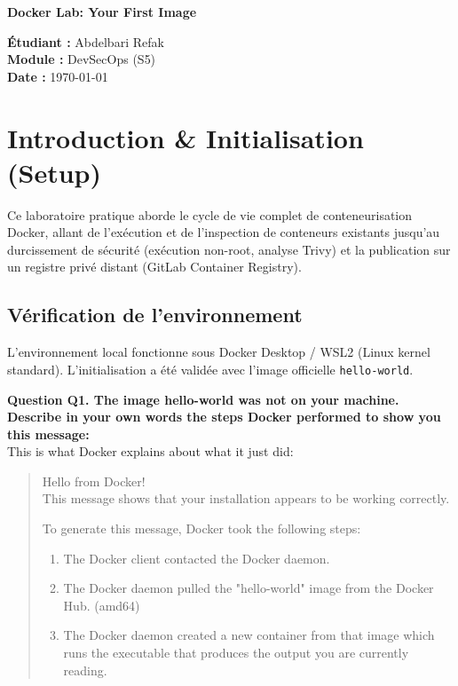 \documentclass[11pt,a4paper]{article}
\begin{document}
\begin{center}
    {\LARGE \textbf{\color{primary} Docker Lab: Your First Image}}\\[0.3cm]
\end{center}

\noindent
\begin{minipage}[t]{0.55\textwidth}
    \textbf{Étudiant :} Abdelbari Refak \\
    \textbf{Module :} DevSecOps (S5) \\
    \textbf{Date :} \today
\end{minipage}
\hfill
\begin{minipage}[t]{0.42\textwidth}
     
\end{minipage}

\vspace{0.5cm}

\section{Introduction \& Initialisation (Setup)}

Ce laboratoire pratique aborde le cycle de vie complet de conteneurisation Docker, allant de l'exécution et de l'inspection de conteneurs existants jusqu'au durcissement de sécurité (exécution non-root, analyse Trivy) et la publication sur un registre privé distant (GitLab Container Registry).

\subsection{Vérification de l'environnement}
L'environnement local fonctionne sous Docker Desktop / WSL2 (Linux kernel standard). L'initialisation a été validée avec l'image officielle \texttt{hello-world}.

\noindent\textbf{Question Q1. The image hello-world was not on your machine. Describe in your own words the steps Docker performed to show you this message:}\\[0.2cm]
This is what Docker explains about what it just did:
\begin{quote}
Hello from Docker!\\
This message shows that your installation appears to be working correctly.

To generate this message, Docker took the following steps:
\begin{enumerate}
    \item The Docker client contacted the Docker daemon.
    \item The Docker daemon pulled the "hello-world" image from the Docker Hub. (amd64)
    \item The Docker daemon created a new container from that image which runs the executable that produces the output you are currently reading.
\end{enumerate}
\end{quote}
\end{document}

